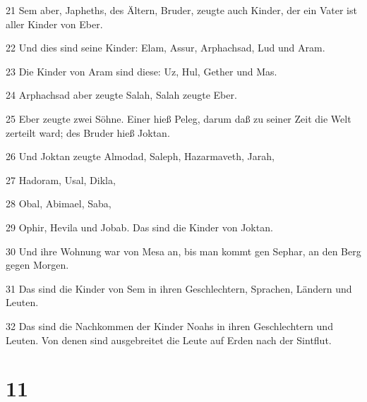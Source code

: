 \par 21 Sem aber, Japheths, des Ältern, Bruder, zeugte auch Kinder, der ein Vater ist aller Kinder von Eber.
\par 22 Und dies sind seine Kinder: Elam, Assur, Arphachsad, Lud und Aram.
\par 23 Die Kinder von Aram sind diese: Uz, Hul, Gether und Mas.
\par 24 Arphachsad aber zeugte Salah, Salah zeugte Eber.
\par 25 Eber zeugte zwei Söhne. Einer hieß Peleg, darum daß zu seiner Zeit die Welt zerteilt ward; des Bruder hieß Joktan.
\par 26 Und Joktan zeugte Almodad, Saleph, Hazarmaveth, Jarah,
\par 27 Hadoram, Usal, Dikla,
\par 28 Obal, Abimael, Saba,
\par 29 Ophir, Hevila und Jobab. Das sind die Kinder von Joktan.
\par 30 Und ihre Wohnung war von Mesa an, bis man kommt gen Sephar, an den Berg gegen Morgen.
\par 31 Das sind die Kinder von Sem in ihren Geschlechtern, Sprachen, Ländern und Leuten.
\par 32 Das sind die Nachkommen der Kinder Noahs in ihren Geschlechtern und Leuten. Von denen sind ausgebreitet die Leute auf Erden nach der Sintflut.

\chapter{11}

